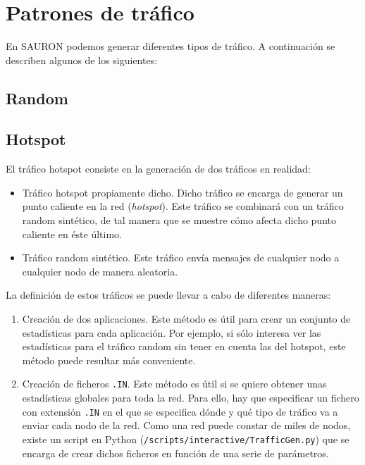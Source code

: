 \section{Patrones de tráfico}%
\label{sec:trafico}
En SAURON podemos generar diferentes tipos de tráfico. A continuación se describen algunos de los siguientes:

\subsection{Random}%
\label{sub:Random}

\subsection{Hotspot}%
\label{sub:Hotspot}
El tráfico hotspot consiste en la generación de dos tráficos en realidad:

\begin{itemize}
	\item Tráfico hotspot propiamente dicho. Dicho tráfico se encarga de generar un punto caliente en la red (\emph{hotspot}). Este tráfico se combinará con un tráfico random sintético, de tal manera que se muestre cómo afecta dicho punto caliente en éste último.
	\item Tráfico random sintético. Este tráfico envía mensajes de cualquier nodo a cualquier nodo de manera aleatoria.
\end{itemize}

La definición de estos tráficos se puede llevar a cabo de diferentes maneras:

\begin{enumerate}
	\item Creación de dos aplicaciones. Este método es útil para crear un conjunto de estadísticas para cada aplicación. Por ejemplo, si sólo interesa ver las estadísticas para el tráfico random sin tener en cuenta las del hotspot, este método puede resultar más conveniente.
	\item Creación de ficheros \verb|.IN|. Este método es útil si se quiere obtener unas estadísticas globales para toda la red. Para ello, hay que especificar un fichero con extensión \verb|.IN| en el que se especifica dónde y qué tipo de tráfico va a enviar cada nodo de la red. Como una red puede constar de miles de nodos, existe un script en Python (\verb|/scripts/interactive/TrafficGen.py|) que se encarga de crear dichos ficheros en función de una serie de parámetros.
\end{enumerate}


